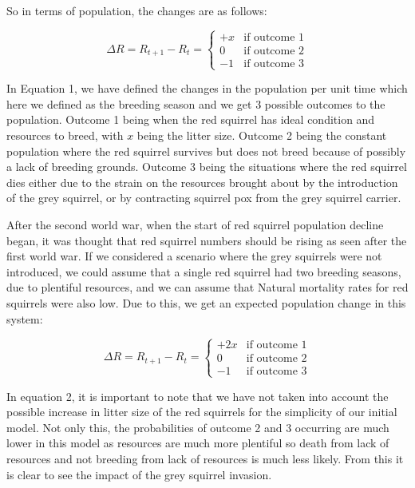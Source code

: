 \documentclass{article}
\begin{document}
So in terms of population, the changes are as follows:

\begin{equation}
  \Delta R = R_{t+1} - R_{t} =
    \begin{cases}
      +x & \text{if outcome 1}\\
      0 & \text{if outcome 2}\\
      -1 & \text{if outcome 3}
    \end{cases}       
\end{equation}

In Equation 1, we have defined the changes in the population per unit time which here we defined as the breeding season and we get 3 possible outcomes to the population. Outcome 1 being when the red squirrel has ideal condition and resources to breed, with $x$ being the litter size. Outcome 2 being the constant population where the red squirrel survives but does not breed because of possibly a lack of breeding grounds. Outcome 3 being the situations where the red squirrel dies either due to the strain on the resources brought about by the introduction of the grey squirrel, or by contracting squirrel pox from the grey squirrel carrier. 

After the second world war, when the start of red squirrel population decline began, it was thought that red squirrel numbers should be rising as seen after the first world war. If we considered a scenario where the grey squirrels were not introduced, we could assume that a single red squirrel had two breeding seasons, due to plentiful resources, and we can assume that Natural mortality rates for red squirrels were also low. Due to this, we get an expected population change in this system: 

\begin{equation}
  \Delta R = R_{t+1} - R_{t} =
    \begin{cases}
      +2x & \text{if outcome 1}\\
      0 & \text{if outcome 2}\\
      -1 & \text{if outcome 3}
    \end{cases}       
\end{equation}


In equation 2, it is important to note that we have not taken into account the possible increase in litter size of the red squirrels for the simplicity of our initial model. Not only this, the probabilities of outcome 2 and 3 occurring are much lower in this model as resources are much more plentiful so death from lack of resources and not breeding from lack of resources is much less likely. From this it is clear to see the impact of the grey squirrel invasion.
\end{document}
